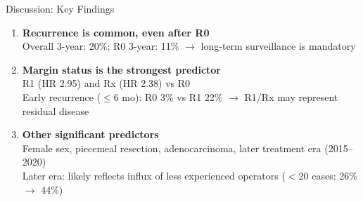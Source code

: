 \documentclass[aspectratio=169,10pt]{beamer}
\renewcommand{\neg}[1]{\textcolor{negative}{#1}}
\begin{document}
\begin{frame}{Discussion: Key Findings}
\begin{enumerate}
  \item \textbf{Recurrence is common, even after R0}\\
  Overall 3-year: 20\%; R0 3-year: 11\% $\to$ \neg{long-term surveillance is mandatory}

  \vspace{6pt}
  \item \textbf{Margin status is the strongest predictor}\\
  R1 (HR 2.95) and Rx (HR 2.38) vs R0\\
  Early recurrence ($\leq$6 mo): R0 3\% vs R1 22\% $\to$ R1/Rx may represent residual disease

  \vspace{6pt}
  \item \textbf{Other significant predictors}\\
  Female sex, piecemeal resection, adenocarcinoma, later treatment era (2015--2020)\\
  Later era: likely reflects influx of less experienced operators ($<$20 cases: 26\% $\to$ 44\%)
\end{enumerate}
\end{frame}
\end{document}
